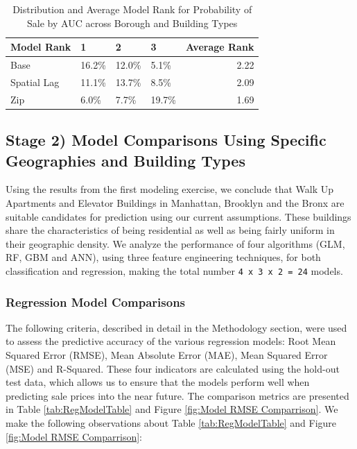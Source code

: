 \documentclass[12pt,]{article}
\begin{document}
\begin{table}

\caption{\label{tab:Prob Model AUC Average Rank}\label{tab:ProbModelAUCRank} Distribution and Average Model Rank for Probability of Sale by AUC across Borough and Building Types}
\centering
\begin{tabular}[t]{llllr}
\toprule
Model Rank & 1 & 2 & 3 & Average Rank\\
\midrule
Base & 16.2\% & 12.0\% & 5.1\% & 2.22\\
Spatial Lag & 11.1\% & 13.7\% & 8.5\% & 2.09\\
Zip & 6.0\% & 7.7\% & 19.7\% & 1.69\\
\bottomrule
\end{tabular}
\end{table}

\hypertarget{stage-2-model-comparisons-using-specific-geographies-and-building-types}{%
\subsection{Stage 2) Model Comparisons Using Specific Geographies and
Building
Types}\label{stage-2-model-comparisons-using-specific-geographies-and-building-types}}

Using the results from the first modeling exercise, we conclude that
Walk Up Apartments and Elevator Buildings in Manhattan, Brooklyn and the
Bronx are suitable candidates for prediction using our current
assumptions. These buildings share the characteristics of being
residential as well as being fairly uniform in their geographic density.
We analyze the performance of four algorithms (GLM, RF, GBM and ANN),
using three feature engineering techniques, for both classification and
regression, making the total number \texttt{4\ x\ 3\ x\ 2\ =\ 24}
models.

\hypertarget{regression-model-comparisons}{%
\subsubsection{Regression Model
Comparisons}\label{regression-model-comparisons}}

The following criteria, described in detail in the Methodology section,
were used to assess the predictive accuracy of the various regression
models: Root Mean Squared Error (RMSE), Mean Absolute Error (MAE), Mean
Squared Error (MSE) and R-Squared. These four indicators are calculated
using the hold-out test data, which allows us to ensure that the models
perform well when predicting sale prices into the near future. The
comparison metrics are presented in Table \ref{tab:RegModelTable} and
Figure \ref{fig:Model RMSE Comparrison}. We make the following
observations about Table \ref{tab:RegModelTable} and Figure
\ref{fig:Model RMSE Comparrison}:
\end{document}
